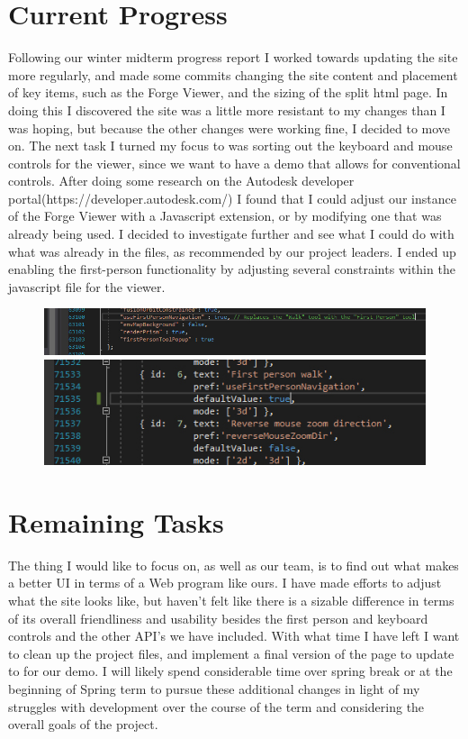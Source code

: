 \documentclass[letterpaper, 10pt, draftclsnofoot, compsoc, onecolumn]{IEEEtran}
\begin{document}
\section{Current Progress}
Following our winter midterm progress report I worked towards updating the site more regularly, and made some commits changing the site content and placement of key items, such as the Forge Viewer, and the sizing of the split html page. In doing this I discovered the site was a little more resistant to my changes than I was hoping, but because the other changes were working fine, I decided to move on. The next task I turned my focus to was sorting out the keyboard and mouse controls for the viewer, since we want to have a demo that allows for conventional controls. After doing some research on the Autodesk developer portal(https://developer.autodesk.com/) I found that I could adjust our instance of the Forge Viewer with a Javascript extension, or by modifying one that was already being used. I decided to investigate further and see what I could do with what was already in the files, as recommended by our project leaders. I ended up enabling the first-person functionality by adjusting several constraints within the javascript file for the viewer.

\begin{figure}[h]
	\centering
	\includegraphics[scale=.5]{firstperson1.jpg}
	\includegraphics[scale=.5]{firstperson2.jpg}
\end{figure}


\section{Remaining Tasks}
The thing I would like to focus on, as well as our team, is to find out what makes a better UI in terms of a Web program like ours. I have made efforts to adjust what the site looks like, but haven't felt like there is a sizable difference in terms of its overall friendliness and usability besides the first person and keyboard controls and the other API's we have included. With what time I have left I want to clean up the project files, and implement a final version of the page to update to for our demo. I will likely spend considerable time over spring break or at the beginning of Spring term to pursue these additional changes in light of my struggles with development over the course of the term and considering the overall goals of the project.
\end{document}
